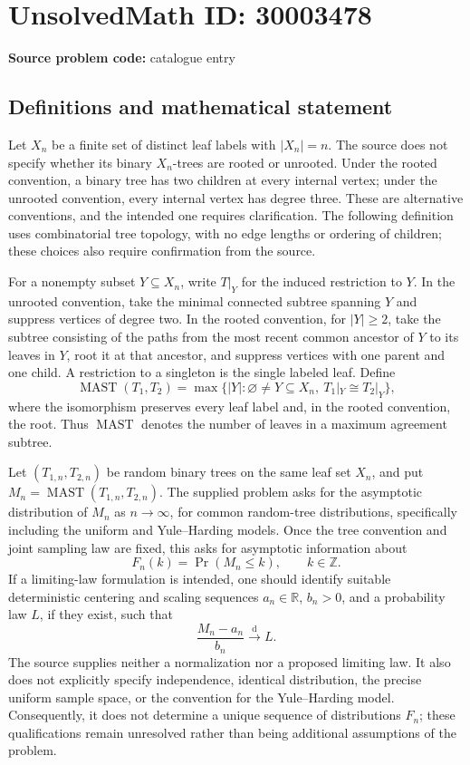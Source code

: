 \documentclass[11pt]{article}
\newcommand{\Z}{\mathbb{Z}}
\newcommand{\R}{\mathbb{R}}
\begin{document}
\section*{UnsolvedMath ID: 30003478}
\textbf{Source problem code:} catalogue entry
\subsection{Definitions and mathematical statement}
Let \(X_n\) be a finite set of distinct leaf labels with \(|X_n|=n\). The source does not specify whether its binary \(X_n\)-trees are rooted or unrooted. Under the rooted convention, a binary tree has two children at every internal vertex; under the unrooted convention, every internal vertex has degree three. These are alternative conventions, and the intended one requires clarification. The following definition uses combinatorial tree topology, with no edge lengths or ordering of children; these choices also require confirmation from the source.

For a nonempty subset \(Y\subseteq X_n\), write \(T|_Y\) for the induced restriction to \(Y\). In the unrooted convention, take the minimal connected subtree spanning \(Y\) and suppress vertices of degree two. In the rooted convention, for \(|Y|\geq2\), take the subtree consisting of the paths from the most recent common ancestor of \(Y\) to its leaves in \(Y\), root it at that ancestor, and suppress vertices with one parent and one child. A restriction to a singleton is the single labeled leaf. Define
\[
\operatorname{MAST}(T_1,T_2)
=\max\bigl\{|Y|:\varnothing\ne Y\subseteq X_n,\ T_1|_Y\cong T_2|_Y\bigr\},
\]
where the isomorphism preserves every leaf label and, in the rooted convention, the root. Thus \(\operatorname{MAST}\) denotes the number of leaves in a maximum agreement subtree.

Let \((T_{1,n},T_{2,n})\) be random binary trees on the same leaf set \(X_n\), and put \(M_n=\operatorname{MAST}(T_{1,n},T_{2,n})\). The supplied problem asks for the asymptotic distribution of \(M_n\) as \(n\to\infty\), for common random-tree distributions, specifically including the uniform and Yule--Harding models. Once the tree convention and joint sampling law are fixed, this asks for asymptotic information about
\[
F_n(k)=\Pr(M_n\leq k),\qquad k\in\Z.
\]
If a limiting-law formulation is intended, one should identify suitable deterministic centering and scaling sequences \(a_n\in\R\), \(b_n>0\), and a probability law \(L\), if they exist, such that
\[
\frac{M_n-a_n}{b_n}\xrightarrow{\mathrm d}L.
\]
The source supplies neither a normalization nor a proposed limiting law. It also does not explicitly specify independence, identical distribution, the precise uniform sample space, or the convention for the Yule--Harding model. Consequently, it does not determine a unique sequence of distributions \(F_n\); these qualifications remain unresolved rather than being additional assumptions of the problem.
\end{document}
